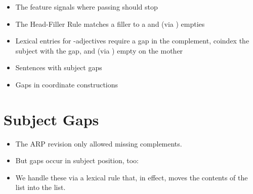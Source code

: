 \documentclass[a4paper,landscape,headrule,footrule]{foils}
\begin{document}
\begin{itemize}
\item The feature  signals where  passing
should stop
\item The Head-Filler Rule matches a filler to a  and
(via ) empties 
\item Lexical entries for -adjectives require a gap in
the complement, coindex the subject with the gap,
and (via ) empty  on the mother
\end{itemize}


\begin{itemize}
\item Sentences with subject gaps
\item Gaps in coordinate constructions
\end{itemize}

\section{Subject Gaps}

\begin{itemize}
\item The ARP revision only allowed missing
complements.
\item But gaps occur in subject position, too:
  \begin{exe}
    \ex {}
  \end{exe}
\item We handle these via a lexical rule that, in effect,
moves the contents of the  list into the  list.
\end{itemize}


\end{document}
